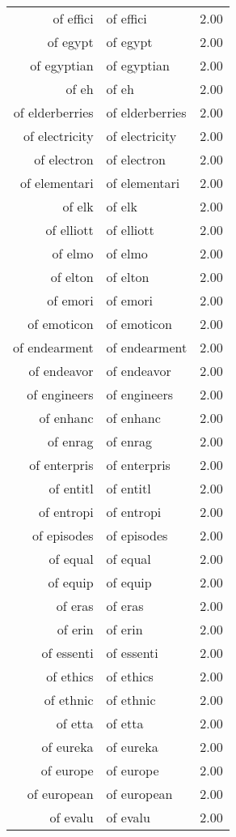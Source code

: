 \begin{table}[ht]
\begin{tabular}{rlr}
  of effici & of effici & 2.00 \\ 
  of egypt & of egypt & 2.00 \\ 
  of egyptian & of egyptian & 2.00 \\ 
  of eh & of eh & 2.00 \\ 
  of elderberries & of elderberries & 2.00 \\ 
  of electricity & of electricity & 2.00 \\ 
  of electron & of electron & 2.00 \\ 
  of elementari & of elementari & 2.00 \\ 
  of elk & of elk & 2.00 \\ 
  of elliott & of elliott & 2.00 \\ 
  of elmo & of elmo & 2.00 \\ 
  of elton & of elton & 2.00 \\ 
  of emori & of emori & 2.00 \\ 
  of emoticon & of emoticon & 2.00 \\ 
  of endearment & of endearment & 2.00 \\ 
  of endeavor & of endeavor & 2.00 \\ 
  of engineers & of engineers & 2.00 \\ 
  of enhanc & of enhanc & 2.00 \\ 
  of enrag & of enrag & 2.00 \\ 
  of enterpris & of enterpris & 2.00 \\ 
  of entitl & of entitl & 2.00 \\ 
  of entropi & of entropi & 2.00 \\ 
  of episodes & of episodes & 2.00 \\ 
  of equal & of equal & 2.00 \\ 
  of equip & of equip & 2.00 \\ 
  of eras & of eras & 2.00 \\ 
  of erin & of erin & 2.00 \\ 
  of essenti & of essenti & 2.00 \\ 
  of ethics & of ethics & 2.00 \\ 
  of ethnic & of ethnic & 2.00 \\ 
  of etta & of etta & 2.00 \\ 
  of eureka & of eureka & 2.00 \\ 
  of europe & of europe & 2.00 \\ 
  of european & of european & 2.00 \\ 
  of evalu & of evalu & 2.00 \\ 

\end{tabular}
\end{table}
